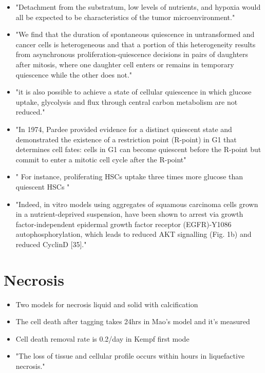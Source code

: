 \documentclass[11pt,a4paper]{article}
\begin{document}
\begin{itemize}
\item "Detachment from the substratum, low levels of nutrients, and hypoxia would all be expected to be characteristics of the tumor microenvironment."\cite{Valcourt2012}

\item  "We find that the duration of spontaneous quiescence in untransformed and cancer cells is heterogeneous and that a portion of this heterogeneity results from asynchronous proliferation-quiescence decisions in pairs of daughters after mitosis, where one daughter cell enters or remains in temporary quiescence while the other does not."\cite{Pulianmackal2021}

\item "it is also possible to achieve a state of cellular quiescence in which glucose uptake, glycolysis and flux through central carbon metabolism are not reduced."\cite{Valcourt2012}

\item "In 1974, Pardee provided evidence for a distinct quiescent state and demonstrated the existence of a restriction point (R-point) in G1 that determines cell fates: cells in G1 can become quiescent before the R-point but commit to enter a mitotic cell cycle after the R-point"\cite{Cheung2013}

\item " For instance, proliferating HSCs uptake three times more glucose than quiescent HSCs " \cite{Marescal2020}

\item "Indeed, in vitro models using aggregates of squamous carcinoma cells grown in a nutrient-deprived suspension, have been shown to arrest via growth factor-independent epidermal growth factor receptor (EGFR)-Y1086 autophosphorylation, which leads to reduced AKT signalling (Fig. 1b) and reduced CyclinD [35]."
\end{itemize}

\section{Necrosis}
\begin{itemize}
\item Two models for necrosis liquid and solid with calcification \cite{Thim2010}\cite{YuMi2017}
\item The cell death after tagging takes 24hrs in Mao's model and it's measured \cite{Mao2018}
\item Cell death removal rate is 0.2/day in Kempf first mode \cite{Kempf2005}
\item "The loss of tissue and cellular profile occurs within hours in liquefactive necrosis." \cite{Adigun2024}
\end{itemize} 
\end{document}
